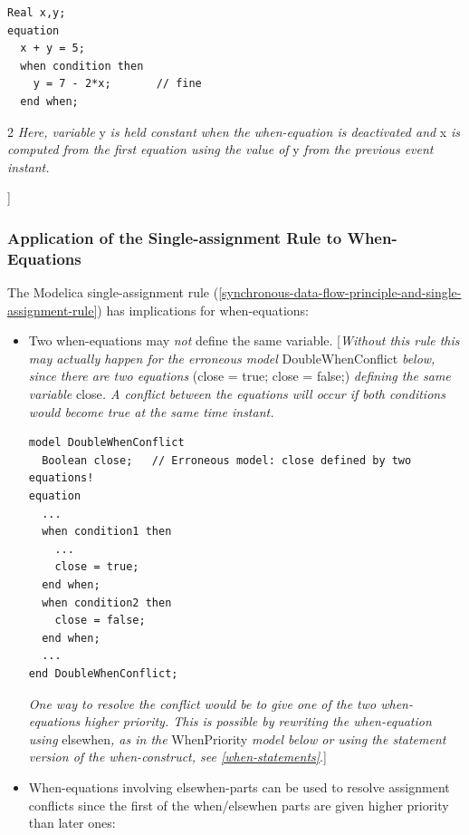\documentclass[10pt,a4paper]{report}
\def\doublelabel#1{\label{#1}\hypertarget{#1}{}}
\begin{document}
\begin{lstlisting}[language=modelica]
  Real x,y; 
equation   
  x + y = 5;   
  when condition then     
    y = 7 - 2*x;       // fine  
  end when;
\end{lstlisting}
2
\emph{Here, variable} y \emph{is held constant when the when-equation is
deactivated and} x \emph{is computed from the first equation using the
value of} y \emph{from the previous event instant.}

{]}

\subsubsection{Application of the Single-assignment Rule to When-Equations}\doublelabel{application-of-the-single-assignment-rule-to-when-equations}

The Modelica single-assignment rule (\ref{synchronous-data-flow-principle-and-single-assignment-rule}) has implications for
when-equations:

\begin{itemize}
\item Two when-equations may \emph{not} define the same variable.
{[}\emph{Without this rule this may actually happen for the erroneous
model} DoubleWhenConflict \emph{below, since there are two equations}
(close = true; close = false;) \emph{defining the same variable}
close\emph{. A conflict between the equations will occur if both
conditions would become true at the same time instant.}

\begin{lstlisting}[language=modelica]
model DoubleWhenConflict   
  Boolean close;   // Erroneous model: close defined by two equations! 
equation   
  ...   
  when condition1 then 
    ...
    close = true;   
  end when;   
  when condition2 then     
    close = false;   
  end when;   
  ... 
end DoubleWhenConflict;
\end{lstlisting}

\emph{One way to resolve the conflict would be to give one of the two
when-equations higher priority. This is possible by rewriting the
when-equation using} elsewhen\emph{, as in the} WhenPriority \emph{model
below or using the statement version of the when-construct, see \ref{when-statements}}.{]}

\item
  When-equations involving elsewhen-parts can be used to resolve
  assignment conflicts since the first of the when/elsewhen parts are
  given higher priority than later ones:
\end{itemize}
\end{document}
